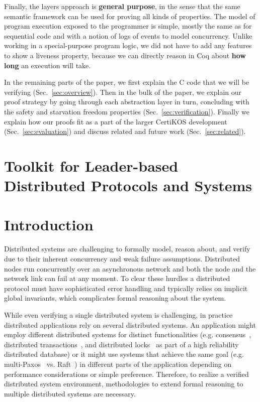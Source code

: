 {Finally, the layers approach is {\bf general purpose}, in the sense
that the same semantic framework can be used for proving all kinds of
properties. The model of program execution exposed to the programmer
is simple, mostly the same as for sequential code and with a notion of logs of events to model concurrency.
Unlike working in a special-purpose program logic, we 
did not have to add any features to show a liveness property, because we can directly reason in Coq about \textbf{how long} an execution will take. 

In the remaining parts of the paper, we first explain the C code that we will be verifying (Sec.~\ref{sec:overview}).
Then in the bulk of the paper, we explain our proof strategy by going through each abstraction layer in turn, concluding with the safety and starvation freedom properties (Sec.~\ref{sec:verification}). Finally we explain how our proofs fit as a part of the larger CertiKOS development (Sec.~\ref{sec:evaluation}) and discuss related and future work (Sec.~\ref{sec:related}).



\section{Toolkit for Leader-based Distributed Protocols and Systems}
\label{chapter:introduction:sec:toolkit-for-leader-based-distributed-protocols-and-systems}

\section{Introduction}
\label{sec:intro}


Distributed systems are challenging to formally model, reason about, and verify
due to their inherent concurrency and weak failure assumptions. Distributed
nodes run concurrently over an asynchronous network and both the node and the
network link can fail at any moment. To clear these hurdles a distributed
protocol must have sophisticated error handling and typically relies on implicit
global invariants, which complicates formal reasoning about the system.


While even verifying a single distributed system is challenging, in practice
distributed applications rely on several distributed systems. An application
might employ different distributed systems for distinct functionalities (e.g.
consensus~\cite{vivaladifference}, distributed transactions~\cite{gray:2006},
and distributed locks~\cite{chubby, zookeeper} as part of a high reliability
distributed database) or it might use systems that achieve the same goal (e.g.
multi-Paxos~\cite{paxosmadesimple, rvrpaxos} vs. Raft~\cite{raft}) in different
parts of the application depending on performance considerations or simple
preference. Therefore, to realize a verified distributed system environment,
methodologies to extend formal reasoning to multiple distributed systems are
necessary.


}
